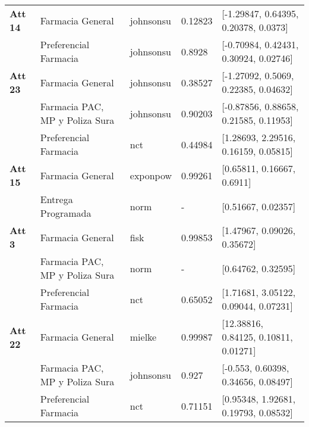 \begin{longtable}[c]{lp{3cm}llp{5cm}}
\textbf{Att 14} & Farmacia General                         & johnsonsu    & 0.12823 & {[}-1.29847, 0.64395, 0.20378, 0.0373{]}                                                 \\
       & Preferencial Farmacia                    & johnsonsu    & 0.8928  & {[}-0.70984, 0.42431, 0.30924, 0.02746{]}                                                \\ \hline
\textbf{Att 23} & Farmacia General                         & johnsonsu    & 0.38527 & {[}-1.27092, 0.5069, 0.22385, 0.04632{]}                                                 \\
       & Farmacia PAC, MP y Poliza Sura           & johnsonsu    & 0.90203 & {[}-0.87856, 0.88658, 0.21585, 0.11953{]}                                                \\
       & Preferencial Farmacia                    & nct          & 0.44984 & {[}1.28693, 2.29516, 0.16159, 0.05815{]}                                                 \\ \hline
\textbf{Att 15} & Farmacia General                         & exponpow     & 0.99261 & {[}0.65811, 0.16667, 0.6911{]}                                                           \\
       & Entrega Programada                       & norm         & -       & {[}0.51667, 0.02357{]}                                                                   \\ \hline
\textbf{Att 3}  & Farmacia General                         & fisk         & 0.99853 & {[}1.47967, 0.09026, 0.35672{]}                                                          \\
       & Farmacia PAC, MP y Poliza Sura           & norm         & -       & {[}0.64762, 0.32595{]}                                                                   \\
       & Preferencial Farmacia                    & nct          & 0.65052 & {[}1.71681, 3.05122, 0.09044, 0.07231{]}                                                 \\ \hline
\textbf{Att 22} & Farmacia General                         & mielke       & 0.99987 & {[}12.38816, 0.84125, 0.10811, 0.01271{]}                                                \\
       & Farmacia PAC, MP y Poliza Sura           & johnsonsu    & 0.927   & {[}-0.553, 0.60398, 0.34656, 0.08497{]}                                                  \\
       & Preferencial Farmacia                    & nct          & 0.71151 & {[}0.95348, 1.92681, 0.19793, 0.08532{]}                                                 \\

\end{longtable}
